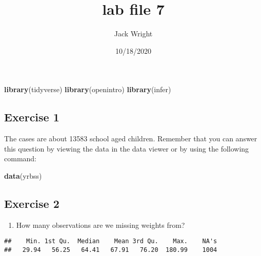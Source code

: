 \documentclass[
]{article}
\title{lab file 7}
\author{Jack Wright}
\date{10/18/2020}
\newenvironment{Shaded}{\begin{snugshade}}{\end{snugshade}}
\newcommand{\KeywordTok}[1]{\textcolor[rgb]{0.13,0.29,0.53}{\textbf{#1}}}
\newcommand{\NormalTok}[1]{#1}
\newcommand{\OperatorTok}[1]{\textcolor[rgb]{0.81,0.36,0.00}{\textbf{#1}}}
\newcommand{\StringTok}[1]{\textcolor[rgb]{0.31,0.60,0.02}{#1}}
\providecommand{\tightlist}{%
  \setlength{\itemsep}{0pt}\setlength{\parskip}{0pt}}
\begin{document}
\maketitle

\begin{Shaded}
\begin{Highlighting}[]
\KeywordTok{library}\NormalTok{(tidyverse)}
\KeywordTok{library}\NormalTok{(openintro)}
\KeywordTok{library}\NormalTok{(infer)}
\end{Highlighting}
\end{Shaded}

\hypertarget{exercise-1}{%
\subsection{Exercise 1}\label{exercise-1}}

The cases are about 13583 school aged children. Remember that you can
answer this question by viewing the data in the data viewer or by using
the following command:

\begin{Shaded}
\begin{Highlighting}[]
\KeywordTok{data}\NormalTok{(yrbss)}
\end{Highlighting}
\end{Shaded}

\hypertarget{exercise-2}{%
\subsection{Exercise 2}\label{exercise-2}}

\begin{enumerate}
\def\labelenumi{\arabic{enumi}.}
\tightlist
\item
  How many observations are we missing weights from?
\end{enumerate}

\begin{Shaded}
\end{Shaded}

\begin{verbatim}
##    Min. 1st Qu.  Median    Mean 3rd Qu.    Max.    NA's 
##   29.94   56.25   64.41   67.91   76.20  180.99    1004
\end{verbatim}

\begin{Shaded}
\end{Shaded}
\end{document}
